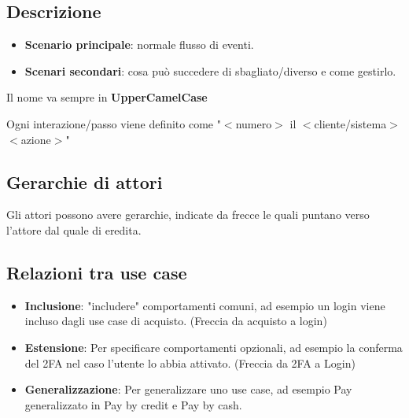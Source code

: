 \subsection{Descrizione}
\begin{itemize}
    \item \textbf{Scenario principale}: normale flusso di eventi.
    \item \textbf{Scenari secondari}: cosa può succedere di sbagliato/diverso e come gestirlo.
\end{itemize}

\noindent Il nome va sempre in \textbf{UpperCamelCase}

\noindent Ogni interazione/passo viene definito come "$<$numero$>$ il $<$cliente/sistema$>$ $<$azione$>$"

\subsection{Gerarchie di attori}
Gli attori possono avere gerarchie, indicate da frecce le quali puntano verso l'attore dal quale di eredita.

\subsection{Relazioni tra use case}
\begin{itemize}
    \item \textbf{Inclusione}: "includere" comportamenti comuni, ad esempio un login viene incluso dagli use case di acquisto. (Freccia da acquisto a login)
    \item \textbf{Estensione}: Per specificare comportamenti opzionali, ad esempio la conferma del 2FA nel caso l'utente lo abbia attivato. (Freccia da 2FA a Login)
    \item \textbf{Generalizzazione}: Per generalizzare uno use case, ad esempio Pay generalizzato in Pay by credit e Pay by cash.
\end{itemize}
